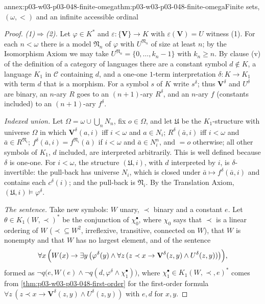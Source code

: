 \begin{annexitem}{annex:p03-w03-p03-048-finite-omega}{thm:p03-w03-p03-048-finite-omega}{Finite sets, \((\omega,<)\) and an infinite accessible ordinal}
\begin{proof}
\emph{(1)\(\Rightarrow\)(2).}  Let \(\varphi\in K^{\ast}\) and
\(\varepsilon:\{\mathbf V\}\to K\) with \(\varepsilon(\mathbf V)=U\) witness
(1).  For each \(n<\omega\) there is a model \(\mathfrak N_n\) of
\(\varphi\) with \(U^{\mathfrak N_n}\) of size at least \(n\); by the
Isomorphism Axiom we may take \(U^{\mathfrak N_n}=\{0,\ldots,k_n-1\}\) with
\(k_n\geq n\).  By clause (v) of the definition of a category of languages
there are a constant symbol \(d\notin K\), a language \(K_1\) in
\(\mathcal C\) containing \(d\), and a one-one \(1\)-term interpretation
\(\delta:K\to K_1\) with term \(d\) that is a morphism.  For a symbol \(s\) of
\(K\) write \(s^{\delta}\); thus \(\mathbf V^{\delta}\) and \(U^{\delta}\) are
binary, an \(n\)-ary \(R\) goes to an \((n+1)\)-ary \(R^{\delta}\), and an
\(n\)-ary \(f\) (constants included) to an \((n+1)\)-ary \(f^{\delta}\).

\emph{Indexed union.}  Let \(\Omega=\omega\cup\bigcup_n N_n\), fix
\(o\in\Omega\), and let \(\mathfrak U\) be the \(K_1\)-structure with
universe \(\Omega\) in which \(\mathbf V^{\delta}(a,i)\) iff \(i<\omega\) and
\(a\in N_i\); \(R^{\delta}(\bar a,i)\) iff \(i<\omega\) and \(\bar a\in
R^{\mathfrak N_i}\); \(f^{\delta}(\bar a,i)=f^{\mathfrak N_i}(\bar a)\) if
\(i<\omega\) and \(\bar a\in N_i^{n}\), and \(=o\) otherwise; all other
symbols of \(K_1\), \(d\) included, are interpreted arbitrarily.  This is
well defined because \(\delta\) is one-one.  For \(i<\omega\), the structure
\((\mathfrak U,i)\), with \(d\) interpreted by \(i\), is
\(\delta\)-invertible: the pull-back has universe \(N_i\), which is closed
under \(\bar a\mapsto f^{\delta}(\bar a,i)\) and contains each
\(c^{\delta}(i)\); and the pull-back is \(\mathfrak N_i\).  By the
Translation Axiom, \((\mathfrak U,i)\models\varphi^{\delta}\).

\emph{The sentence.}  Take new symbols: \(W\) unary, \(\prec\) binary and a
constant \(e\).  Let \(\theta\in K_1(W,\prec)^{\ast}\) be the conjunction of
\(\chi_0^{\bullet}\), where \(\chi_0\) says that \(\prec\) is a linear
ordering of \(W\) (\(\prec\subseteq W^{2}\), irreflexive, transitive,
connected on \(W\)), that \(W\) is nonempty and that \(W\) has no largest
element, and of the sentence
\[
\forall x\,\Bigl(W(x)\to\exists y\,\bigl(\varphi^{\delta}(y)\land\forall z\,
(z\prec x\to\mathbf V^{\delta}(z,y)\land U^{\delta}(z,y))\bigr)\Bigr),
\]
formed as \(\neg q\bigl(e,W(e)\land\neg q(d,\varphi^{\delta}\land
\chi_1^{\bullet})\bigr)\), where \(\chi_1^{\bullet}\in K_1(W,\prec,e)^{\ast}\)
comes from \cref{thm:p03-w03-p03-048-first-order} for the first-order
formula \(\forall z\,(z\prec x\to\mathbf V^{\delta}(z,y)\land
U^{\delta}(z,y))\) with \(e,d\) for \(x,y\).


\end{proof}
\end{annexitem}
